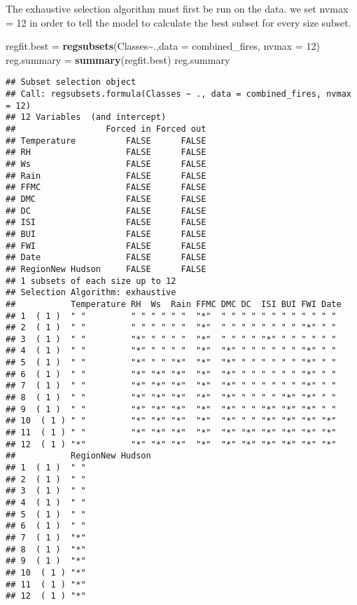 \documentclass[
]{article}
\newenvironment{Shaded}{\begin{snugshade}}{\end{snugshade}}
\newcommand{\AttributeTok}[1]{\textcolor[rgb]{0.13,0.29,0.53}{#1}}
\newcommand{\DecValTok}[1]{\textcolor[rgb]{0.00,0.00,0.81}{#1}}
\newcommand{\FunctionTok}[1]{\textcolor[rgb]{0.13,0.29,0.53}{\textbf{#1}}}
\newcommand{\NormalTok}[1]{#1}
\newcommand{\OtherTok}[1]{\textcolor[rgb]{0.56,0.35,0.01}{#1}}
\newcommand{\SpecialCharTok}[1]{\textcolor[rgb]{0.81,0.36,0.00}{\textbf{#1}}}
\begin{document}
The exhaustive selection algorithm must first be run on the data. we set
nvmax = 12 in order to tell the model to calculate the best subset for
every size subset.

\begin{Shaded}
\begin{Highlighting}[]
\NormalTok{regfit.best }\OtherTok{=} \FunctionTok{regsubsets}\NormalTok{(Classes}\SpecialCharTok{\textasciitilde{}}\NormalTok{.,}\AttributeTok{data =}\NormalTok{ combined\_fires, }\AttributeTok{nvmax =} \DecValTok{12}\NormalTok{)}
\NormalTok{reg.summary }\OtherTok{=} \FunctionTok{summary}\NormalTok{(regfit.best)}
\NormalTok{reg.summary}
\end{Highlighting}
\end{Shaded}

\begin{verbatim}
## Subset selection object
## Call: regsubsets.formula(Classes ~ ., data = combined_fires, nvmax = 12)
## 12 Variables  (and intercept)
##                  Forced in Forced out
## Temperature          FALSE      FALSE
## RH                   FALSE      FALSE
## Ws                   FALSE      FALSE
## Rain                 FALSE      FALSE
## FFMC                 FALSE      FALSE
## DMC                  FALSE      FALSE
## DC                   FALSE      FALSE
## ISI                  FALSE      FALSE
## BUI                  FALSE      FALSE
## FWI                  FALSE      FALSE
## Date                 FALSE      FALSE
## RegionNew Hudson     FALSE      FALSE
## 1 subsets of each size up to 12
## Selection Algorithm: exhaustive
##           Temperature RH  Ws  Rain FFMC DMC DC  ISI BUI FWI Date
## 1  ( 1 )  " "         " " " " " "  "*"  " " " " " " " " " " " " 
## 2  ( 1 )  " "         " " " " " "  "*"  " " " " " " " " "*" " " 
## 3  ( 1 )  " "         "*" " " " "  "*"  " " " " "*" " " " " " " 
## 4  ( 1 )  " "         "*" " " " "  "*"  "*" " " " " " " "*" " " 
## 5  ( 1 )  " "         "*" " " "*"  "*"  "*" " " " " " " "*" " " 
## 6  ( 1 )  " "         "*" "*" "*"  "*"  "*" " " " " " " "*" " " 
## 7  ( 1 )  " "         "*" "*" "*"  "*"  "*" " " " " " " "*" " " 
## 8  ( 1 )  " "         "*" "*" "*"  "*"  "*" " " " " "*" "*" " " 
## 9  ( 1 )  " "         "*" "*" "*"  "*"  "*" " " "*" "*" "*" " " 
## 10  ( 1 ) " "         "*" "*" "*"  "*"  "*" " " "*" "*" "*" "*" 
## 11  ( 1 ) " "         "*" "*" "*"  "*"  "*" "*" "*" "*" "*" "*" 
## 12  ( 1 ) "*"         "*" "*" "*"  "*"  "*" "*" "*" "*" "*" "*" 
##           RegionNew Hudson
## 1  ( 1 )  " "             
## 2  ( 1 )  " "             
## 3  ( 1 )  " "             
## 4  ( 1 )  " "             
## 5  ( 1 )  " "             
## 6  ( 1 )  " "             
## 7  ( 1 )  "*"             
## 8  ( 1 )  "*"             
## 9  ( 1 )  "*"             
## 10  ( 1 ) "*"             
## 11  ( 1 ) "*"             
## 12  ( 1 ) "*"
\end{verbatim}
\end{document}
